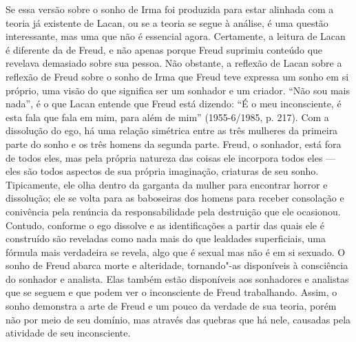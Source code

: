 Se essa versão sobre o sonho de Irma foi produzida para estar alinhada
com a teoria já existente de Lacan, ou se a teoria se segue à análise, é
uma questão interessante, mas uma que não é essencial agora. Certamente,
a leitura de Lacan é diferente da de Freud, e não apenas porque Freud
suprimiu conteúdo que revelava demasiado sobre sua pessoa. Não obstante,
a reflexão de Lacan sobre a reflexão de Freud sobre o sonho de Irma que
Freud teve expressa um sonho em si próprio, uma visão do que significa
ser um sonhador e um criador. ``Não sou mais nada'', é o que Lacan
entende que Freud está dizendo: ``É o meu inconsciente, é esta fala que
fala em mim, para além de mim'' (1955-6/1985, p. 217). Com a dissolução do ego, há
uma relação simétrica entre as três mulheres da primeira parte do sonho
e os três homens da segunda parte. Freud, o sonhador, está fora de todos
eles, mas pela própria natureza das coisas ele incorpora todos eles ---
eles são todos aspectos de sua própria imaginação, criaturas de seu
sonho. Tipicamente, ele olha dentro da garganta da mulher para encontrar
horror e dissolução; ele se volta para as baboseiras dos homens para
receber consolação e conivência pela renúncia da responsabilidade pela
destruição que ele ocasionou. Contudo, conforme o ego dissolve e as
identificações a partir das quais ele é construído são reveladas como
nada mais do que lealdades superficiais, uma fórmula mais verdadeira se
revela, algo que é sexual mas não é em si sexuado. O sonho de Freud
abarca morte e alteridade, tornando"-as disponíveis à consciência do
sonhador e analista. Elas também estão disponíveis aos sonhadores e
analistas que se seguem e que podem ver o inconsciente de Freud
trabalhando. Assim, o sonho demonstra a arte de Freud e um pouco da
verdade de sua teoria, porém não por meio de seu domínio, mas através
das quebras que há nele, causadas pela atividade de seu inconsciente.

